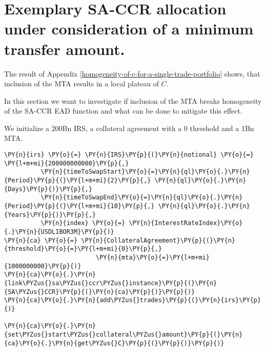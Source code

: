     

    
    \hypertarget{exemplary-sa-ccr-allocation-under-consideration-of-a-minimum-transfer-amount.}{%
\section{Exemplary SA-CCR allocation under consideration of a minimum
transfer
amount.}\label{exemplary-sa-ccr-allocation-under-consideration-of-a-minimum-transfer-amount.}}

    The result of Appendix
\ref{homogeneity-of-c-for-a-single-trade-portfolio} shows, that
inclusion of the MTA results in a local plateau of \(C\).

In this section we want to investigate if inclusion of the MTA breaks
homogeneity of the SA-CCR EAD function and what can be done to mitigate
this effect.

We initialize a 200Bn IRS, a collateral agreement with a 0 threshold and
a 1Bn MTA.

    \begin{tcolorbox}[breakable, size=fbox, boxrule=1pt, pad at break*=1mm,colback=cellbackground, colframe=cellborder]
\begin{Verbatim}[commandchars=\\\{\}]
\PY{n}{irs} \PY{o}{=} \PY{n}{IRS}\PY{p}{(}\PY{n}{notional} \PY{o}{=} \PY{l+m+mi}{200000000000}\PY{p}{,}
          \PY{n}{timeToSwapStart}\PY{o}{=}\PY{n}{ql}\PY{o}{.}\PY{n}{Period}\PY{p}{(}\PY{l+m+mi}{2}\PY{p}{,} \PY{n}{ql}\PY{o}{.}\PY{n}{Days}\PY{p}{)}\PY{p}{,}
          \PY{n}{timeToSwapEnd}\PY{o}{=}\PY{n}{ql}\PY{o}{.}\PY{n}{Period}\PY{p}{(}\PY{l+m+mi}{10}\PY{p}{,} \PY{n}{ql}\PY{o}{.}\PY{n}{Years}\PY{p}{)}\PY{p}{,}
          \PY{n}{index} \PY{o}{=} \PY{n}{InterestRateIndex}\PY{o}{.}\PY{n}{USDLIBOR3M}\PY{p}{)}
\PY{n}{ca} \PY{o}{=} \PY{n}{CollateralAgreement}\PY{p}{(}\PY{n}{threshold}\PY{o}{=}\PY{l+m+mi}{0}\PY{p}{,}
                         \PY{n}{mta}\PY{o}{=}\PY{l+m+mi}{1000000000}\PY{p}{)}
\PY{n}{ca}\PY{o}{.}\PY{n}{link\PYZus{}sa\PYZus{}ccr\PYZus{}instance}\PY{p}{(}\PY{n}{SA\PYZus{}CCR}\PY{p}{(}\PY{n}{ca}\PY{p}{)}\PY{p}{)}
\PY{n}{ca}\PY{o}{.}\PY{n}{add\PYZus{}trades}\PY{p}{(}\PY{n}{irs}\PY{p}{)}

\PY{n}{ca}\PY{o}{.}\PY{n}{set\PYZus{}start\PYZus{}collateral\PYZus{}amount}\PY{p}{(}\PY{n}{ca}\PY{o}{.}\PY{n}{get\PYZus{}C}\PY{p}{(}\PY{p}{)}\PY{p}{)}
\end{Verbatim}
\end{tcolorbox}

